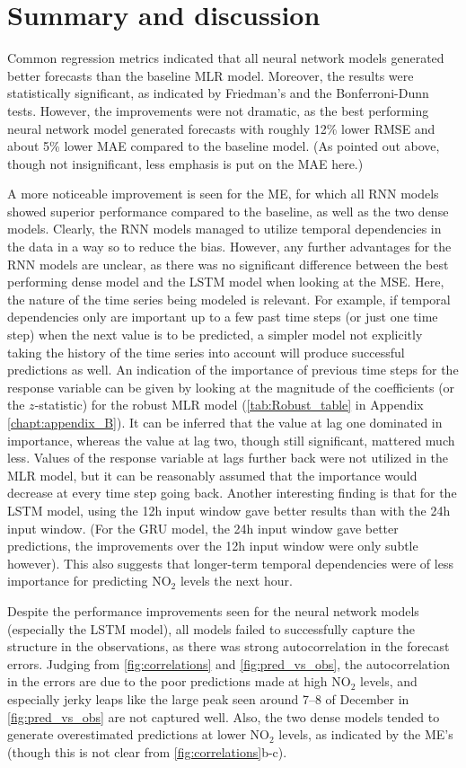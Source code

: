 \section{Summary and discussion}
Common regression metrics indicated that all neural network models generated better forecasts than the baseline MLR model. Moreover, the results were statistically significant, as indicated by Friedman's and the Bonferroni-Dunn tests. However, the improvements were not dramatic, as the best performing neural network model generated forecasts with roughly 12\% lower RMSE and about 5\% lower MAE compared to the baseline model. (As pointed out above, though not insignificant, less emphasis is put on the MAE here.) 

A more noticeable improvement is seen for the ME, for which all RNN models showed superior performance compared to the baseline, as well as the two dense models. Clearly, the RNN models managed to utilize temporal dependencies in the data in a way so to reduce the bias. However, any further advantages for the RNN models are unclear, as there was no significant difference between the best performing dense model and the LSTM model when looking at the MSE. Here, the nature of the time series being modeled is relevant. For example, if temporal dependencies only are important up to a few past time steps (or just one time step) when the next value is to be predicted, a simpler model not explicitly taking the history of the time series into account will produce successful predictions as well. An indication of the importance of previous time steps for the response variable can be given by looking at the magnitude of the coefficients (or the $z$-statistic) for the robust MLR model (\cref{tab:Robust_table} in Appendix \ref{chapt:appendix_B}). It can be inferred that the value at lag one dominated in importance, whereas the value at lag two, though still significant, mattered much less. Values of the response variable at lags further back were not utilized in the  MLR model, but it can be reasonably assumed that the importance would decrease at every time step going back. Another interesting finding is that for the LSTM model, using the 12h input window gave better results than with the 24h input window. (For the GRU model, the 24h input window gave better predictions, the improvements over the 12h input window were only subtle however). This also suggests that longer-term temporal dependencies were of less importance for predicting NO$_2$ levels the next hour. 

Despite the performance improvements seen for the neural network models (especially the LSTM model), all models failed to successfully capture the structure in the observations, as there was strong autocorrelation in the forecast errors. Judging from \cref{fig:correlations} and \cref{fig:pred_vs_obs}, the autocorrelation in the errors are due to the poor predictions made at high NO$_2$ levels, and especially jerky leaps like the large peak seen around 7--8 of December in \cref{fig:pred_vs_obs} are not captured well. Also, the two dense models tended to generate overestimated predictions at lower NO$_2$ levels, as indicated by the ME's (though this is not clear from \cref{fig:correlations}b-c).

